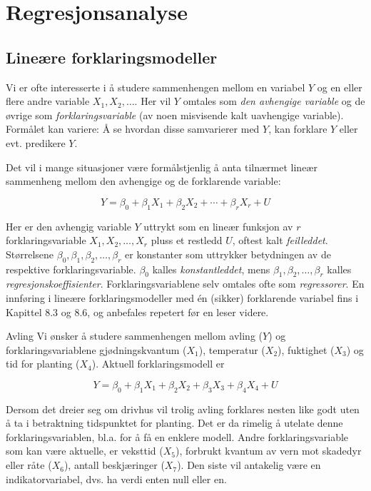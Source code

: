 \chapter{Regresjonsanalyse}
\label{kap:regresjonsanalyse} %

\section{Lineære forklaringsmodeller}

Vi er ofte interesserte i å studere sammenhengen mellom en variabel $Y$
og en eller flere andre variable $X_1, X_2, \ldots $.
Her vil $Y$ omtales som {\em den avhengige variable} og de øvrige som   
{\em forklaringsvariable} (av noen misvisende kalt uavhengige variable).
Formålet kan variere: Å se hvordan disse samvarierer med $Y$,
kan forklare $Y$ eller evt. predikere $Y$.


Det vil i mange situasjoner være formålstjenlig å anta 
tilnærmet lineær sammenheng mellom den avhengige og de forklarende
variable:

\[  Y={\beta}_0 + {\beta}_1X_1 + {\beta}_2X_2 + \cdots + {\beta}_rX_r + U \]

\noindent Her er den avhengig variable $Y$ uttrykt som en
lineær funksjon av $r$ for\-klarings\-variable $X_1, X_2, \ldots , X_r$
pluss et restledd $U$, oftest kalt {\em feilleddet}.  Størrelsene
${\beta}_0, {\beta}_1, {\beta}_2, \ldots , {\beta}_r$ er konstanter som
uttrykker betydningen av de respektive forklaringsvariable. $ {\beta}_0$
kalles {\em konstantleddet}, mens $ {\beta}_1, {\beta}_2, \ldots , {\beta}_r$
kalles {\em regresjonskoeffisienter}.  Forklaringsvariablene selv omtales
ofte som {\em regressorer}.
En innføring i lineære forklaringsmodeller med \'{e}n (sikker) 
for\-klarende variabel fins i Kapittel 8.3 og 8.6, og anbefales repetert
før en leser videre.\\



\begin{eksempel}{Avling}
Vi ønsker å studere sammenhengen mellom avling ($Y$) og
forklaringsvariablene  gjødningskvantum ($X_1$), temperatur ($X_2$),
fuktighet ($X_3$) og tid for planting ($X_4$). Aktuell forklaringsmodell er

\[ Y= {\beta}_0 + {\beta}_1X_1 + {\beta}_2X_2 + {\beta}_3X_3 +
                                                   {\beta}_4X_4 + U \]

\noindent Dersom det dreier seg om drivhus vil trolig avling forklares nesten
like godt uten å ta i betraktning tidspunktet for planting.  Det er da
rimelig å
utelate denne forklaringsvariablen, bl.a. for å få en enklere modell.
Andre forklaringsvariable som kan være aktuelle, er veksttid ($X_5$),  
forbrukt kvantum av vern mot skadedyr eller råte ($X_6$), antall
beskjæringer ($X_7$).  Den siste vil antakelig være en 
indikatorvariabel, dvs. ha verdi enten null eller en.
\end {eksempel}

